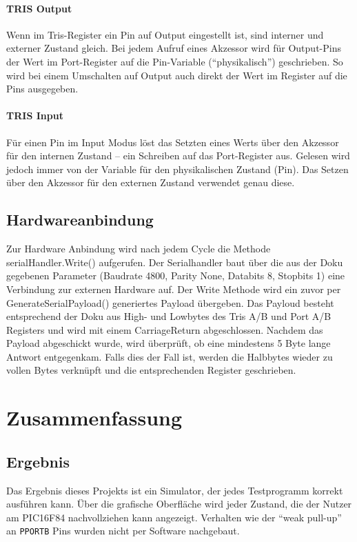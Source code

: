 \paragraph{TRIS Output}
Wenn im Tris-Register ein Pin auf Output eingestellt ist,
sind interner und externer Zustand gleich.
Bei jedem Aufruf eines Akzessor wird für Output-Pins der Wert im Port-Register auf die Pin-Variable (\enquote{physikalisch}) geschrieben.
So wird bei einem Umschalten auf Output auch direkt der Wert im Register auf die Pins ausgegeben.  


\paragraph{TRIS Input}
Für einen Pin im Input Modus löst das Setzten eines Werts über den Akzessor für den internen Zustand – ein Schreiben auf das Port-Register aus.
Gelesen wird jedoch immer von der Variable für den physikalischen Zustand (Pin).
Das Setzen über den Akzessor für den externen Zustand verwendet genau diese.


\subsection{Hardwareanbindung}
Zur Hardware Anbindung wird nach jedem Cycle die Methode serialHandler.Write() aufgerufen. Der Serialhandler baut über die aus der Doku gegebenen Parameter (Baudrate 4800, Parity None, Databits 8, Stopbits 1) eine Verbindung zur externen Hardware auf. Der Write Methode wird ein zuvor per GenerateSerialPayload() generiertes Payload übergeben. Das Payloud besteht entsprechend der Doku aus High- und Lowbytes des Tris A/B und Port A/B Registers und wird mit einem CarriageReturn abgeschlossen. Nachdem das Payload abgeschickt wurde, wird überprüft, ob eine mindestens 5 Byte lange Antwort entgegenkam. Falls dies der Fall ist, werden die Halbbytes wieder zu vollen Bytes verknüpft und die entsprechenden Register geschrieben.


\section{Zusammenfassung}

\subsection{Ergebnis}
Das Ergebnis dieses Projekts ist ein Simulator,
der jedes Testprogramm korrekt ausführen kann.
Über die grafische Oberfläche wird jeder Zustand,
die der Nutzer am PIC16F84 nachvollziehen kann angezeigt.
Verhalten wie der \enquote{weak pull-up} an \texttt{PPORTB} Pins wurden nicht per Software nachgebaut.

